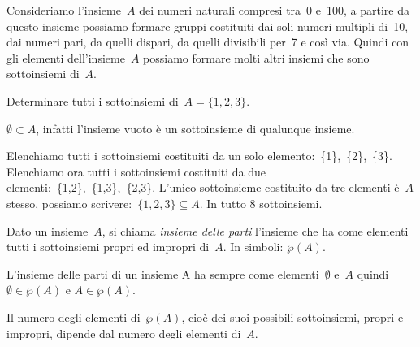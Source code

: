 Consideriamo l'insieme~$A$ dei numeri naturali
compresi tra~0 e~100, a partire da questo insieme possiamo formare
gruppi costituiti dai soli numeri multipli di~10, dai numeri pari, da
quelli dispari, da quelli divisibili per~7 e così via. Quindi con gli
elementi dell'insieme~$A$ possiamo formare molti
altri insiemi che sono sottoinsiemi di~$A$.

\begin{exrig}
 \begin{esempio}
Determinare tutti i sottoinsiemi di~$A=\{1,2,3\}$.

$\emptyset \subset A$, infatti l'insieme vuoto è un
sottoinsieme di qualunque insieme.

Elenchiamo tutti i sottoinsiemi costituiti da un solo 
elemento:~\{1\},~\{2\},~\{3\}.
Elenchiamo ora tutti i sottoinsiemi costituiti da due 
elementi:~\{1,2\},~\{1,3\},~\{2,3\}.
L'unico sottoinsieme costituito da tre elementi è~$A$ stesso, possiamo 
scrivere:~$\{1,2,3\}\subseteq A$. In tutto 8 sottoinsiemi.
 \end{esempio}

\end{exrig}

\begin{definizione}
Dato un insieme~$A$, si chiama \emph{insieme delle parti} l'insieme che ha 
come elementi tutti i sottoinsiemi propri ed impropri di~$A$. In simboli:
$\wp (A)$.
\end{definizione}

L'insieme delle parti di un insieme A ha sempre come
elementi~$\emptyset $ e~$A$ quindi~$\emptyset\in\wp (A)$ e
$A\in\wp (A)$.

Il numero degli elementi di~$\wp (A)$, cioè dei suoi possibili
sottoinsiemi, propri e impropri, dipende dal numero degli elementi di~$A$.

